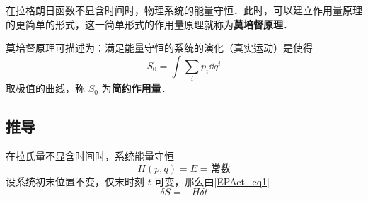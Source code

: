 在拉格朗日函数不显含时间时，物理系统的能量守恒．此时，可以建立作用量原理的更简单的形式，这一简单形式的作用量原理就称为\textbf{莫培督原理}．

莫培督原理可描述为：满足能量守恒的系统的演化（真实运动）是使得
\begin{equation}
S_0=\int\sum_i p_i\dd q^i
\end{equation}
取极值的曲线，称 $S_0$ 为\textbf{简约作用量}．
\subsection{推导}
在拉氏量不显含时间时，系统能量守恒
\begin{equation}
H(p,q)=E=\text{常数}
\end{equation}
设系统初末位置不变，仅末时刻 $t$ 可变，那么由\autoref{EPAct_eq1}~
\begin{equation}
\delta S=-H\delta t
\end{equation}
